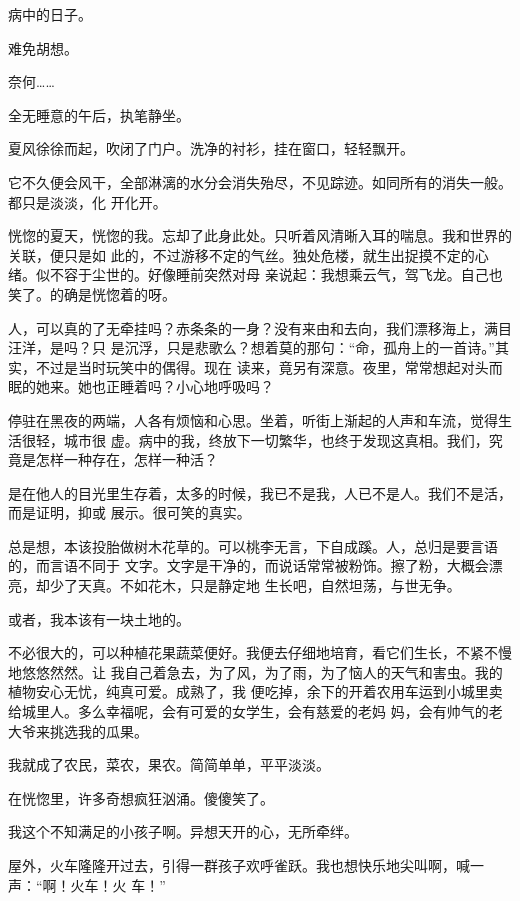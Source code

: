 		病中的日子。

		难免胡想。

		奈何……

	\endwriting



		全无睡意的午后，执笔静坐。

		夏风徐徐而起，吹闭了门户。洗净的衬衫，挂在窗口，轻轻飘开。

		它不久便会风干，全部淋漓的水分会消失殆尽，不见踪迹。如同所有的消失一般。都只是淡淡，化
	开化开。

		恍惚的夏天，恍惚的我。忘却了此身此处。只听着风清晰入耳的喘息。我和世界的关联，便只是如
	此的，不过游移不定的气丝。独处危楼，就生出捉摸不定的心绪。似不容于尘世的。好像睡前突然对母
	亲说起：我想乘云气，驾飞龙。自己也笑了。的确是恍惚着的呀。

		人，可以真的了无牵挂吗？赤条条的一身？没有来由和去向，我们漂移海上，满目汪洋，是吗？只
	是沉浮，只是悲歌么？想着莫的那句：“命，孤舟上的一首诗。”其实，不过是当时玩笑中的偶得。现在
	读来，竟另有深意。夜里，常常想起对头而眠的她来。她也正睡着吗？小心地呼吸吗？

		停驻在黑夜的两端，人各有烦恼和心思。坐着，听街上渐起的人声和车流，觉得生活很轻，城市很
	虚。病中的我，终放下一切繁华，也终于发现这真相。我们，究竟是怎样一种存在，怎样一种活？

		是在他人的目光里生存着，太多的时候，我已不是我，人已不是人。我们不是活，而是证明，抑或
	展示。很可笑的真实。

		总是想，本该投胎做树木花草的。可以桃李无言，下自成蹊。人，总归是要言语的，而言语不同于
	文字。文字是干净的，而说话常常被粉饰。擦了粉，大概会漂亮，却少了天真。不如花木，只是静定地
	生长吧，自然坦荡，与世无争。

		或者，我本该有一块土地的。

		不必很大的，可以种植花果蔬菜便好。我便去仔细地培育，看它们生长，不紧不慢地悠悠然然。让
	我自己着急去，为了风，为了雨，为了恼人的天气和害虫。我的植物安心无忧，纯真可爱。成熟了，我
	便吃掉，余下的开着农用车运到小城里卖给城里人。多么幸福呢，会有可爱的女学生，会有慈爱的老妈
	妈，会有帅气的老大爷来挑选我的瓜果。

		我就成了农民，菜农，果农。简简单单，平平淡淡。

		在恍惚里，许多奇想疯狂汹涌。傻傻笑了。

		我这个不知满足的小孩子啊。异想天开的心，无所牵绊。

		屋外，火车隆隆开过去，引得一群孩子欢呼雀跃。我也想快乐地尖叫啊，喊一声：“啊！火车！火
	车！”

